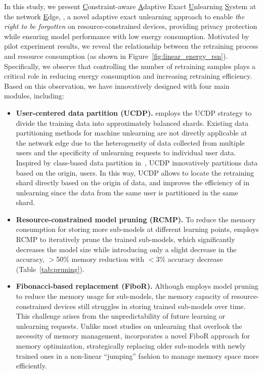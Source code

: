 \documentclass[conference,compsoc]{IEEEtran}
\begin{document}
In this study, we present \underline{C}onstraint-aware \underline{A}daptive Exact \underline{U}nlearning \underline{S}ystem at the network \underline{E}dge, \textbf{\tool}, a novel adaptive exact unlearning approach to enable \textit{the right to be forgotten} on resource-constrained devices, providing privacy protection while ensuring model performance with low energy consumption. 
Motivated by pilot experiment results, we reveal the relationship between the retraining process and resource consumption (as shown in Figure~\ref{fig:linear_energy_rsn}). Specifically, we observe that controlling the number of retraining samples plays a critical role in reducing energy consumption and increasing retraining efficiency. Based on this observation, we have innovatively designed \tool with four main modules, including:
\begin{itemize}[leftmargin=*,noitemsep]
    \item \textbf{User-centered data partition (UCDP).}
    \tool employs the UCDP strategy to divide the training data into approximately balanced shards.
    Existing data partitioning methods for machine unlearning are not directly applicable at the network edge due to the heterogeneity of data collected from multiple users and the specificity of unlearning requests to individual user data. Inspired by class-based data partition in~\cite{yan2022arcane}, UCDP innovatively partitions data based on the origin, \ie users. In this way, UCDP allows \tool to locate the retraining shard directly based on the origin of data, and improves the efficiency of \tool in unlearning since the data from the same user is partitioned in the same shard. 
    \item \textbf{Resource-constrained model pruning (RCMP).} To reduce the memory consumption for storing more sub-models at different learning points, \tool employs RCMP to iteratively prune the trained sub-models, which significantly decreases the model  size while introducing only a slight decrease in the accuracy, \eg $>$50\% memory reduction with $<$3\% accuracy decrease (Table~\ref{tab:pruning}).
    \item \textbf{Fibonacci-based replacement (FiboR).} Although \tool employs model pruning to reduce the memory usage for sub-models, the memory capacity of resource-constrained devices still struggles in storing trained sub-models over time. This challenge arises from the unpredictability of future learning or unlearning requests. Unlike most studies on unlearning that overlook the necessity of memory management, \tool incorporates a novel FiboR approach for memory optimization, strategically replacing older sub-models with newly trained ones in a non-linear ``jumping'' fashion to manage memory space more efficiently.

\end{itemize}
\end{document}
